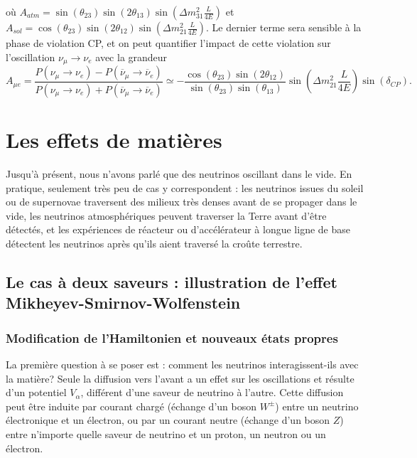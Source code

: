             où $A_{atm} = \sin(\theta_{23})\sin(2\theta_{13})\sin\left(\Delta m^2_{31}\frac{L}{4E}\right)$ et $A_{sol} =\cos(\theta_{23})\sin(2\theta_{12})\sin\left(\Delta m^2_{21}\frac{L}{4E}\right)$. Le dernier terme sera sensible à la phase de violation CP, et on peut quantifier l'impact de cette violation sur l'oscillation $\nu_{\mu}\to\nu_e$ avec la grandeur
            \begin{equation}\label{eq::CP_A_factor}
                A_{\mu e} = \frac{P(\nu_{\mu}\to\nu_e)-P(\overline{\nu}_{\mu}\to\overline{\nu}_e)}{P(\nu_{\mu}\to\nu_e)+P(\overline{\nu}_{\mu}\to\overline{\nu}_e)} \simeq -\frac{\cos(\theta_{23})\sin(2\theta_{12})}{\sin(\theta_{23})\sin(\theta_{13})}\sin\left(\Delta m^2_{21}\frac{L}{4E}\right)\sin(\delta_{CP}).
            \end{equation}


    \section{Les effets de matières}\label{sec::matter_effect}
        Jusqu'à présent, nous n'avons parlé que des neutrinos oscillant dans le vide. En pratique, seulement très peu de cas y correspondent : les neutrinos issues du soleil ou de supernovae traversent des milieux très denses avant de se propager dans le vide, les neutrinos atmosphériques peuvent traverser la Terre avant d'être détectés, et les expériences de réacteur ou d'accélérateur à longue ligne de base détectent les neutrinos après qu'ils aient traversé la croûte terrestre.
        \subsection{Le cas à deux saveurs : illustration de l'effet Mikheyev-Smirnov-Wolfenstein}
            \subsubsection{Modification de l'Hamiltonien et nouveaux états propres}
            La première question à se poser est : comment les neutrinos interagissent-ils avec la matière? Seule la diffusion vers l'avant a un effet sur les oscillations\cite{Wolfenstein1978,Akhmedov2000} et résulte d'un potentiel $V_{\alpha}$, différent d'une saveur de neutrino à l'autre. Cette diffusion peut être induite par courant chargé (échange d'un boson $W^{\pm}$) entre un neutrino électronique et un électron, ou par un courant neutre (échange d'un boson $Z$) entre n'importe quelle saveur de neutrino et un proton, un neutron ou un électron.
            
